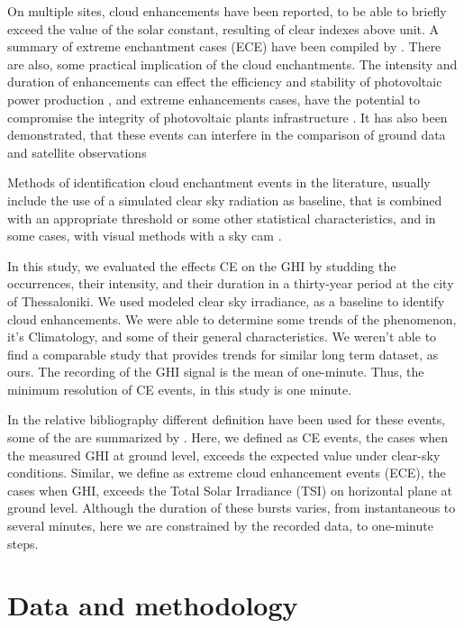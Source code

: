 \documentclass[preprint, 5p,
authoryear]{elsarticle} %
\begin{document}
On multiple sites, cloud enhancements have been reported, to be able to
briefly exceed the value of the solar constant, resulting of clear
indexes above unit. A summary of extreme enchantment cases (ECE) have
been compiled by \citet{Martins2022}. There are also, some practical
implication of the cloud enchantments. The intensity and duration of
enhancements can effect the efficiency and stability of photovoltaic
power production \citep{Lappalainen2020, Jaervelae2020}, and extreme
enhancements cases, have the potential to compromise the integrity of
photovoltaic plants infrastructure \citep{DoNascimento2019}. It has also
been demonstrated, that these events can interfere in the comparison of
ground data and satellite observations \citep{Damiani2018}

Methods of identification cloud enchantment events in the literature,
usually include the use of a simulated clear sky radiation as baseline,
that is combined with an appropriate threshold or some other statistical
characteristics, and in some cases, with visual methods with a sky cam
\citep[ and references therein]{Vamvakas2020, Mol2023}.

In this study, we evaluated the effects CE on the GHI by studding the
occurrences, their intensity, and their duration in a thirty-year period
at the city of Thessaloniki. We used modeled clear sky irradiance, as a
baseline to identify cloud enhancements. We were able to determine some
trends of the phenomenon, it's Climatology, and some of their general
characteristics. We weren't able to find a comparable study that
provides trends for similar long term dataset, as ours. The recording of
the GHI signal is the mean of one-minute. Thus, the minimum resolution
of CE events, in this study is one minute.

In the relative bibliography different definition have been used for
these events, some of the are summarized by \citet{Gueymard2017}. Here,
we defined as CE events, the cases when the measured GHI at ground
level, exceeds the expected value under clear-sky conditions. Similar,
we define as extreme cloud enhancement events (ECE), the cases when GHI,
exceeds the Total Solar Irradiance (TSI) on horizontal plane at ground
level. Although the duration of these bursts varies, from instantaneous
to several minutes, here we are constrained by the recorded data, to
one-minute steps.

\hypertarget{data-and-methodology}{%
\section{Data and methodology}\label{data-and-methodology}}
\end{document}
